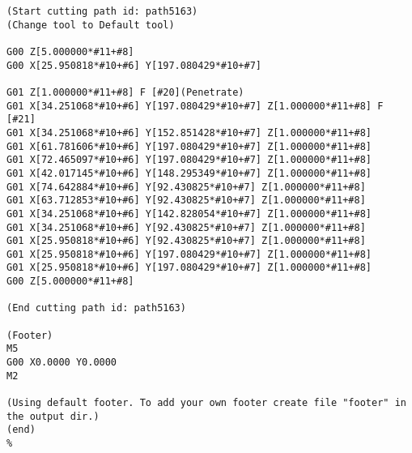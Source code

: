 \begin{lstlisting}[caption={App4-Display full listing for 2D KSG G-Code}, label=App4-Display full listing for 2D KSG G-Code]
(Start cutting path id: path5163)
(Change tool to Default tool)

G00 Z[5.000000*#11+#8]
G00 X[25.950818*#10+#6] Y[197.080429*#10+#7]

G01 Z[1.000000*#11+#8] F [#20](Penetrate)
G01 X[34.251068*#10+#6] Y[197.080429*#10+#7] Z[1.000000*#11+#8] F [#21]
G01 X[34.251068*#10+#6] Y[152.851428*#10+#7] Z[1.000000*#11+#8]
G01 X[61.781606*#10+#6] Y[197.080429*#10+#7] Z[1.000000*#11+#8]
G01 X[72.465097*#10+#6] Y[197.080429*#10+#7] Z[1.000000*#11+#8]
G01 X[42.017145*#10+#6] Y[148.295349*#10+#7] Z[1.000000*#11+#8]
G01 X[74.642884*#10+#6] Y[92.430825*#10+#7] Z[1.000000*#11+#8]
G01 X[63.712853*#10+#6] Y[92.430825*#10+#7] Z[1.000000*#11+#8]
G01 X[34.251068*#10+#6] Y[142.828054*#10+#7] Z[1.000000*#11+#8]
G01 X[34.251068*#10+#6] Y[92.430825*#10+#7] Z[1.000000*#11+#8]
G01 X[25.950818*#10+#6] Y[92.430825*#10+#7] Z[1.000000*#11+#8]
G01 X[25.950818*#10+#6] Y[197.080429*#10+#7] Z[1.000000*#11+#8]
G01 X[25.950818*#10+#6] Y[197.080429*#10+#7] Z[1.000000*#11+#8]
G00 Z[5.000000*#11+#8]

(End cutting path id: path5163)

(Footer)
M5
G00 X0.0000 Y0.0000
M2

(Using default footer. To add your own footer create file "footer" in the output dir.)
(end)
%
\end{lstlisting}

